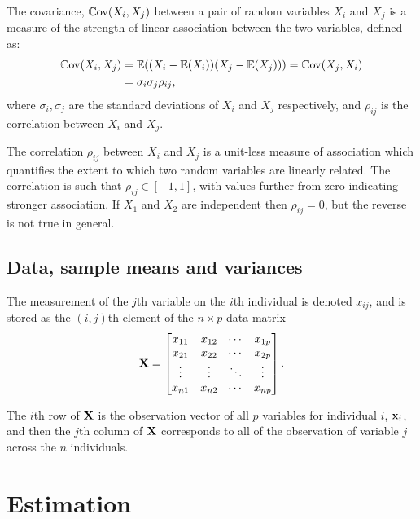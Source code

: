 \documentclass[10pt, a4paper]{article}
\begin{document}
\begin{definition}
    The covariance,
    $\mathbb{C}\mathrm{ov}(X_i, X_j)$ between a pair of random variables $X_i$ and $X_j$ is a measure of the strength of linear association between the two variables,
    defined as:
    \begin{align*}
        \mathbb{C}\mathrm{ov}(X_i, X_j) &= \mathbb{E}((X_i - \mathbb{E}(X_i))(X_j - \mathbb{E}(X_j))) = \mathbb{C}\mathrm{ov}(X_j, X_i) \\
        &= \sigma_i\sigma_j\rho_{ij},
    \end{align*}
    where $\sigma_i, \sigma_j$ are the standard deviations of $X_i$ and $X_j$ respectively,
    and $\rho_{ij}$ is the correlation between $X_i$ and $X_j$.

    The correlation $\rho_{ij}$ between $X_i$ and $X_j$ is a unit-less measure of association which quantifies the extent to which two random variables are linearly related.
    The correlation is such that $\rho_{ij} \in [-1, 1]$,
    with values further from zero indicating stronger association.
    If $X_1$ and $X_2$ are independent then $\rho_{ij} = 0$,
    but the reverse is not true in general.
\end{definition}

\subsection{Data,
sample means and variances}

\begin{definition}
    The measurement of the $j$th variable on the $i$th individual is denoted $x_{ij}$,
    and is stored as the $(i, j)$th element of the $n \times p$ data matrix
    \[
    \mathbf{X} = \begin{bmatrix}
        x_{11} & x_{12} & \dotsi & x_{1p} \\
        x_{21} & x_{22} & \dotsi & x_{2p} \\
        \vdots & \vdots & \ddots & \vdots \\
        x_{n1} & x_{n2} & \dotsi & x_{np} \\
    \end{bmatrix}.
    \]
\end{definition}
The $i$th row of $\mathbf{X}$ is the observation vector of all $p$ variables for individual $i$,
$\mathbf{x}_i$,
and then the $j$th column of $\mathbf{X}$ corresponds to all of the observation of variable $j$ across the $n$ individuals.

\newpage

\section{Estimation}
\end{document}
